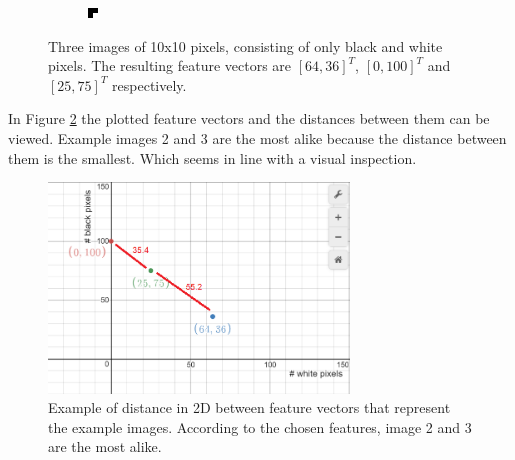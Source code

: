 \documentclass{article}
\begin{document}
\begin{figure}[H]
\begin{subfigure}[b]{0.2\textwidth}
	\end{subfigure}
	\begin{subfigure}[b]{0.2\textwidth}
		\includegraphics[width=\textwidth]{images/mostlyblack.png}
	\end{subfigure}
	\caption{Three images of 10x10 pixels, consisting of only black and white pixels. The resulting feature vectors are $[64,36]^T$, $[0, 100]^T$ and $[25,75]^T$ respectively.}
	\label{featurevectorimages}
\end{figure}

In Figure \ref{fig:distanceexample} the plotted feature vectors and the distances between them can be viewed. Example images 2 and 3 are the most alike because the distance between them is the smallest. Which seems in line with a visual inspection.

\begin{figure}[H]
	\includegraphics[width=8cm]{images/distanceexample.png}
	\centering
	\caption{Example of distance in 2D between feature vectors that represent the example images. According to the chosen features, image 2 and 3 are the most alike.}
	\label{fig:distanceexample}
\end{figure}
\end{document}
